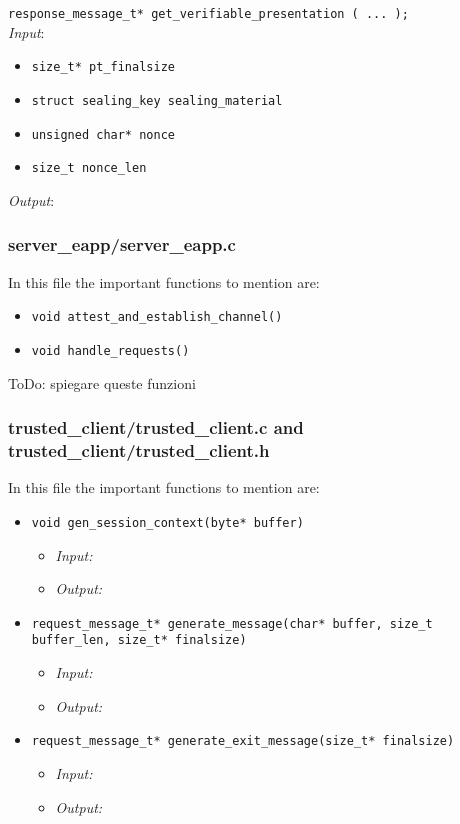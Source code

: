 \noindent
\texttt{response\_message\_t* get\_verifiable\_presentation ( ... );
}\\
\textit{Input}:
\begin{itemize}[noitemsep,nolistsep]
  \item \texttt{size\_t* pt\_finalsize}
  \item \texttt{struct sealing\_key sealing\_material}
  \item \texttt{unsigned char* nonce}
  \item \texttt{size\_t nonce\_len}
\end{itemize}
\textit{Output}: 

\subsubsection{server\_eapp/server\_eapp.c}
In this file the important functions to mention are:
\begin{itemize}
  \item \texttt{void attest\_and\_establish\_channel()}
  \item \texttt{void handle\_requests()}
\end{itemize}
{\color{red} ToDo: spiegare queste funzioni}\\

\subsubsection{trusted\_client/trusted\_client.c and trusted\_client/trusted\_client.h}
In this file the important functions to mention are:
\begin{itemize}[noitemsep,nolistsep]
  \item \texttt{void gen\_session\_context(byte* buffer)} 
  \begin{itemize}[noitemsep]
    \item \textit{Input:}
    \item \textit{Output:}
  \end{itemize}

  \item \texttt{request\_message\_t* generate\_message(char* buffer, size\_t buffer\_len, size\_t* finalsize)}
  \begin{itemize}[noitemsep]
    \item \textit{Input:}
    \item \textit{Output:}
  \end{itemize}
  \item \texttt{request\_message\_t* generate\_exit\_message(size\_t* finalsize)}
  \begin{itemize}[noitemsep]
    \item \textit{Input:}
    \item \textit{Output:}
  \end{itemize}
\end{itemize}
   

